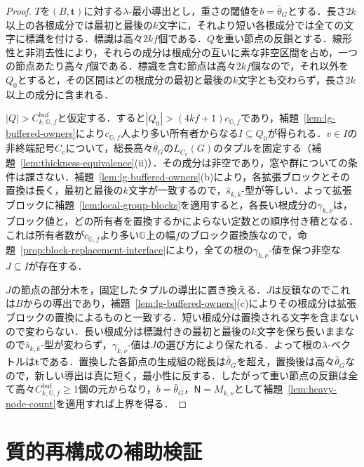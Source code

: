 \documentclass[11pt,a4paper]{ltjsarticle}
\numberwithin{equation}{section}
\theoremstyle{plain}
\theoremstyle{definition}
\theoremstyle{remark}
\begin{document}
\begin{proof}
$T$を$(B,\mathbf t)$に対する$\lambda$-最小導出とし，重さの閾値を$b=\bar\theta_G$とする．長さ$2k$以上の各根成分では最初と最後の$k$文字に，それより短い各根成分では全ての文字に標識を付ける．標識は高々$2kf$個である．$Q$を重い節点の反鎖とする．線形性と非消去性により，それらの成分は根成分の互いに素な非空区間を占め，一つの節点あたり高々$f$個である．標識を含む節点は高々$2kf$個なので，それ以外を$Q_0$とすると，その区間はどの根成分の最初と最後の$k$文字とも交わらず，長さ$2k$以上の成分に含まれる．

$|Q|>C^{\mathrm{buf}}_{k,{\mathbb G},f}$と仮定する．すると$|Q_0|>(4kf+1)c_{{\mathbb G},f}$であり，補題~\ref{lem:lg-buffered-owners}により$c_{{\mathbb G},f}$人より多い所有者からなる$I\subseteq Q_0$が得られる．$v\in I$の非終端記号$C_v$について，総長高々$\bar\theta_G$の$L_{C_v}(G)$のタプルを固定する（補題~\ref{lem:thickness-equivalence}(ii)）．その成分は非空であり，窓や群についての条件は課さない．補題~\ref{lem:lg-buffered-owners}(b)により，各拡張ブロックとその置換は長く，最初と最後の$k$文字が一致するので，$\widehat s_{k,k}$-型が等しい．よって拡張ブロックに補題~\ref{lem:local-group-blocks}を適用すると，各長い根成分の$\gamma_{k,\nu}$は，ブロック値と，どの所有者を置換するかによらない定数との順序付き積となる．これは所有者数が$c_{{\mathbb G},f}$より多い${\mathbb G}$上の幅$f$のブロック置換族なので，命題~\ref{prop:block-replacement-interface}により，全ての根の$\gamma_{k,\nu}$-値を保つ非空な$J\subseteq I$が存在する．

$J$の節点の部分木を，固定したタプルの導出に置き換える．$J$は反鎖なのでこれは$B$からの導出であり，補題~\ref{lem:lg-buffered-owners}(c)によりその根成分は拡張ブロックの置換によるものと一致する．短い根成分は置換される文字を含まないので変わらない．長い根成分は標識付きの最初と最後の$k$文字を保ち長いままなので$\widehat s_{k,k}$-型が変わらず，$\gamma_{k,\nu}$-値は$J$の選び方により保たれる．よって根の$\lambda$-ベクトルは$\mathbf t$である．置換した各節点の生成組の総長は$\bar\theta_G$を超え，置換後は高々$\bar\theta_G$なので，新しい導出は真に短く，最小性に反する．したがって重い節点の反鎖は全て高々$C^{\mathrm{buf}}_{k,{\mathbb G},f}\ge1$個の元からなり，$b=\bar\theta_G$，$\mathsf N=M_{k,\nu}$として補題~\ref{lem:heavy-node-count}を適用すれば上界を得る．
\end{proof}

\section{質的再構成の補助検証}
\label{app:qualitative-construction-details}
\end{document}
